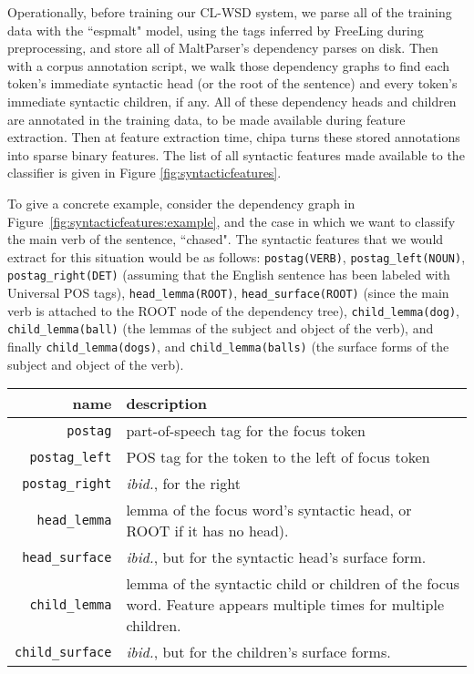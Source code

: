Operationally, before training our CL-WSD system, we parse all of the training
data with the ``espmalt" model, using the tags inferred by FreeLing during
preprocessing, and store all of MaltParser's dependency parses on disk.
Then with a corpus annotation script, we walk those dependency
graphs to find each token's immediate syntactic head (or the root of the
sentence) and every token's immediate syntactic children, if any. All of these
dependency heads and children are annotated in the training data, to be made
available during feature extraction. Then at feature extraction time, chipa
turns these stored annotations into sparse binary features. The list of all
syntactic features made available to the classifier is given in Figure
\ref{fig:syntacticfeatures}.

To give a concrete example, consider the dependency graph in
Figure~\ref{fig:syntacticfeatures:example}, and the case in which we want to
classify the main verb of the sentence, ``chased". The syntactic features that
we would extract for this situation would be as follows:
\texttt{postag(VERB)}, \texttt{postag\_left(NOUN)}, \texttt{postag\_right(DET)}
(assuming that the English sentence has been labeled with Universal POS tags),
\texttt{head\_lemma(ROOT)}, \texttt{head\_surface(ROOT)} (since the main verb is
attached to the ROOT node of the dependency tree),
\texttt{child\_lemma(dog)}, \texttt{child\_lemma(ball)} (the lemmas of the
subject and object of the verb), and finally 
\texttt{child\_lemma(dogs)}, and \texttt{child\_lemma(balls)} (the surface forms
of the subject and object of the verb).

\begin{figure*}
  \begin{centering}
  \begin{tabular}{|r|p{11cm}|}
    \hline
    name          & description  \\
    \hline
    \texttt{postag}    & part-of-speech tag for the focus token \\
    \hline
    \texttt{postag\_left}  & POS tag for the token to the left of focus token \\
    \hline
    \texttt{postag\_right} & \emph{ibid.}, for the right \\
    \hline
    \texttt{head\_lemma} & lemma of the focus word's syntactic head, or ROOT if
    it has no head). \\
    \hline
    \texttt{head\_surface} & \emph{ibid.}, but for the syntactic head's surface
    form. \\
    \hline
    \texttt{child\_lemma} & lemma of the syntactic child or children of the
    focus word. Feature appears multiple times for multiple children. \\
    \hline
    \texttt{child\_surface} & \emph{ibid.}, but for the children's surface
    forms. \\
    \hline
  \end{tabular}
  \end{centering}
  \caption{Additional syntactic features}
  \label{fig:syntacticfeatures}
\end{figure*}

